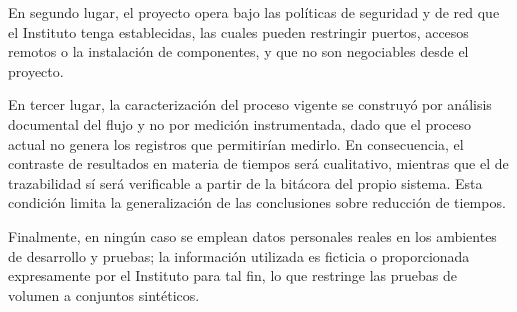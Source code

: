 En segundo lugar, el proyecto opera bajo las políticas de seguridad y de red que el Instituto tenga establecidas, las cuales pueden restringir puertos, accesos remotos o la instalación de componentes, y que no son negociables desde el proyecto.

En tercer lugar, la caracterización del proceso vigente se construyó por análisis documental del flujo y no por medición instrumentada, dado que el proceso actual no genera los registros que permitirían medirlo. En consecuencia, el contraste de resultados en materia de tiempos será cualitativo, mientras que el de trazabilidad sí será verificable a partir de la bitácora del propio sistema. Esta condición limita la generalización de las conclusiones sobre reducción de tiempos.

Finalmente, en ningún caso se emplean datos personales reales en los ambientes de desarrollo y pruebas; la información utilizada es ficticia o proporcionada expresamente por el Instituto para tal fin, lo que restringe las pruebas de volumen a conjuntos sintéticos.


